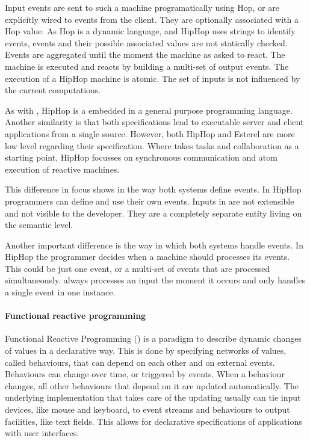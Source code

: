 Input events are sent to such a machine programatically using Hop, or are explicitly wired to events from the client.
They are optionally associated with a Hop value.
As Hop is a dynamic language, and HipHop uses strings to identify events, events and their possible associated values are not statically checked.
Events are aggregated until the moment the machine as asked to react.
The machine is executed and reacts by building a multi-set of output events.
The execution of a HipHop machine is atomic.
The set of inputs is not influenced by the current computations.

As with \TOPHAT, HipHop is a \DSL embedded in a general purpose programming language.
Another similarity is that both specifications lead to executable server and client applications from a single source.
However, both HipHop and Esterel are more low level regarding their specification.
Where \TOPHAT takes tasks and collaboration as a starting point,
HipHop focusses on synchronous communication and atom execution of reactive machines.

This difference in focus shows in the way both systems define events.
In HipHop programmers can define and use their own events.
Inputs in \TOPHAT are not extensible and not visible to the developer.
They are a completely separate entity living on the semantic level.

Another important difference is the way in which both systems handle events.
In HipHop the programmer decides when a machine should processes its events.
This could be just one event, or a multi-set of events that are processed simultaneously.
\TOPHAT always processes an input the moment it occurs and only handles a single event in one instance.



\paragraph{Functional reactive programming}

Functional Reactive Programming (\FRP) is a paradigm to describe dynamic changes of values in a declarative way.
This is done by specifying networks of values, called behaviours, that can depend on each other and on external events.
Behaviours can change over time, or triggered by events.
When a behaviour changes, all other behaviours that depend on it are updated automatically.
The underlying implementation that takes care of the updating usually can tie input devices, like mouse and keyboard, to event streams and behaviours to output facilities, like text fields.
This allows for declarative specifications of applications with user interfaces.

